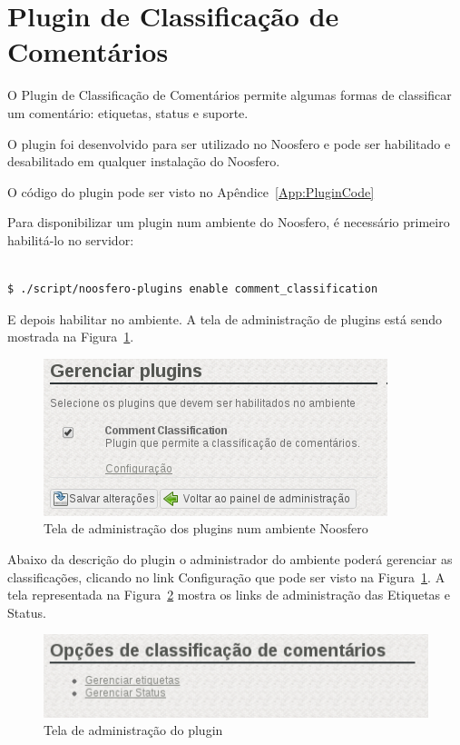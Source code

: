 \documentclass[11pt]{article}
\begin{document}
\section{Plugin de Classificação de Comentários}

O Plugin de Classificação de Comentários permite algumas formas de
classificar um comentário: etiquetas, status e suporte.

O plugin foi desenvolvido para ser utilizado no Noosfero e pode ser
habilitado e desabilitado em qualquer instalação do Noosfero.

O código do plugin pode ser visto no Apêndice~\ref{App:PluginCode}

Para disponibilizar um plugin num ambiente do Noosfero, é necessário
primeiro habilitá-lo no servidor:

\begin{verbatim}

$ ./script/noosfero-plugins enable comment_classification

\end{verbatim}

E depois habilitar no ambiente. A tela de administração de plugins está
sendo mostrada na Figura~\ref{fig:environment-admin-page}.

\begin{figure}[h]
\center
\includegraphics[scale=0.6]{environment-admin-page.png}
\caption{Tela de administração dos plugins num ambiente Noosfero}
\label{fig:environment-admin-page}
\end{figure}

Abaixo da descrição do plugin o administrador do ambiente poderá
gerenciar as classificações, clicando no link Configuração que pode ser
visto na Figura~\ref{fig:environment-admin-page}. A tela representada na
Figura~\ref{fig:plugin-admin-page} mostra os links de administração das
Etiquetas e Status.

\begin{figure}[h]
\center
\includegraphics[scale=0.6]{plugin-admin-page.png}
\caption{Tela de administração do plugin}
\label{fig:plugin-admin-page}
\end{figure}
\end{document}
